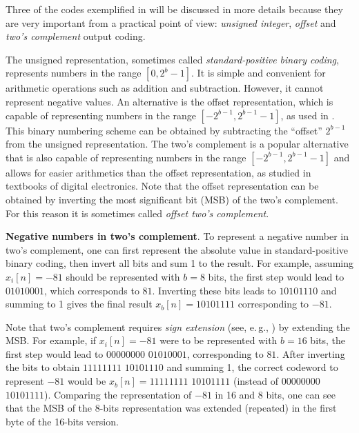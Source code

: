 Three of the codes exemplified in  will be discussed in more details because they are very important from a practical point of view: \emph{unsigned integer}, \emph{offset} and \emph{two's complement} output coding.

The unsigned representation, sometimes called \emph{standard-positive binary coding}, represents numbers in the range $[0,2^b-1]$. It is simple and convenient for arithmetic operations such as addition and subtraction. However, it cannot represent negative values. An alternative is the offset representation, which is capable of representing numbers in the range $[-2^{b-1},2^{b-1}-1]$, as used in . This binary numbering scheme can be obtained by subtracting the ``offset'' $2^{b-1}$ from the unsigned representation. The two's complement is a popular alternative that is also capable of representing numbers in the range $[-2^{b-1},2^{b-1}-1]$ and allows for easier arithmetics than the offset representation, as studied in textbooks of digital electronics. Note that the offset representation can be obtained by inverting the most significant bit (MSB) of the two's complement. For this reason it is sometimes called \emph{offset two's complement}.

\bExample \textbf{Negative numbers in two's complement}.
To represent a negative number in two's complement, one can first represent the absolute value in standard-positive binary coding, then invert all bits and sum 1 to the result. For example, assuming $x_i[n]=-81$ should be represented with $b=8$ bits, the first step would lead to $0101 0001$, which corresponds to $81$. Inverting these bits leads to $1010 1110$ and summing to 1 gives the final result $x_b[n]=1010 1111$ corresponding to $-81$.

Note that two's complement requires \emph{sign extension} (see, e.\,g., ) by extending the MSB. For example, if $x_i[n]=-81$ were to be represented with $b=16$ bits, the 
first step would lead to $0000 0000$ $0101 0001$, corresponding to $81$. After inverting the bits to obtain $1111 1111$ $1010 1110$ and summing 1, the correct codeword to represent $-81$ would be $x_b[n]=1111 1111$ $1010 1111$ (instead of $0000 0000$ $1010 1111$). Comparing the representation of $-81$ in 16 and 8 bits, one can see that the MSB of the 8-bits representation was extended (repeated) in the first byte of the 16-bits version.
\eExample

